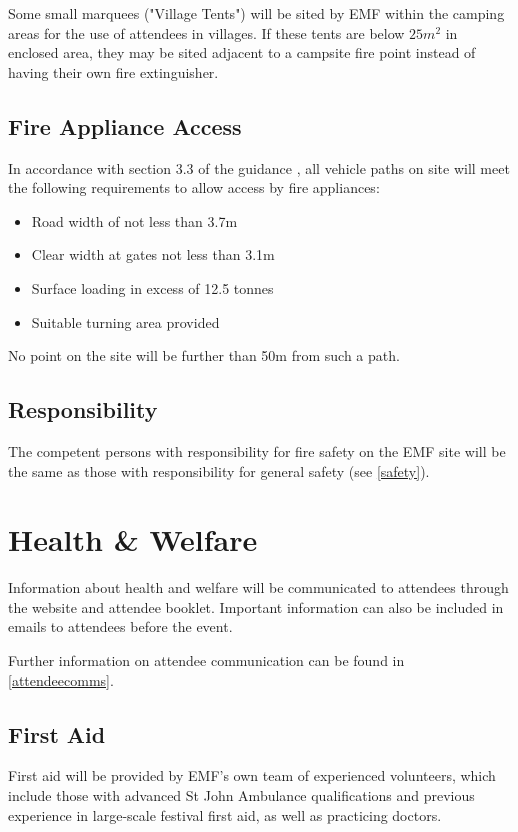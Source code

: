 Some small marquees ("Village Tents") will be sited by EMF within the camping areas for the use of
attendees in villages. If these tents are below $25m^2$ in enclosed area, they may be sited adjacent
to a campsite fire point instead of having their own fire extinguisher.

\subsection{Fire Appliance Access}
In accordance with section 3.3 of the guidance \cite{firesafety}, all vehicle paths on site
will meet the following requirements to allow access by fire appliances:

\begin{itemize}
\tightlist
\item Road width of not less than 3.7m
\item Clear width at gates not less than 3.1m
\item Surface loading in excess of 12.5 tonnes
\item Suitable turning area provided
\end{itemize}

No point on the site will be further than 50m from such a path.

\subsection{Responsibility}
The competent persons with responsibility for fire safety on the EMF site will be the same
as those with responsibility for general safety (see \cref{safety}).

\newpage
\section{Health \& Welfare}
\label{healthwelfare}

Information about health and welfare will be communicated to attendees through the website
and attendee booklet. Important information can also be included in emails to attendees
before the event.

Further information on attendee communication can be found in \cref{attendeecomms}.

\subsection{First Aid}

First aid will be provided by EMF's own team of experienced volunteers,
which include those with advanced St John Ambulance qualifications and previous
experience in large-scale festival first aid, as well as practicing doctors. 

